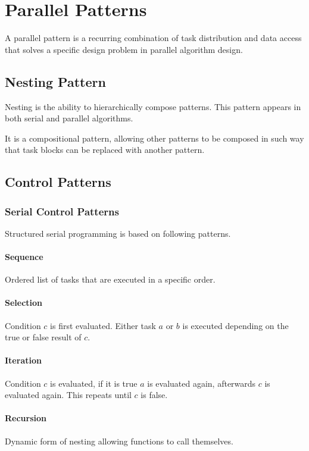 \section{Parallel Patterns}

A parallel pattern is a recurring combination of task distribution and data access that solves a specific design problem in parallel algorithm design.

\subsection{Nesting Pattern}

Nesting is the ability to hierarchically compose patterns.
This pattern appears in both serial and parallel algorithms.

It is a compositional pattern, allowing other patterns to be composed in such way that task blocks can be replaced with another pattern.

\subsection{Control Patterns}

\subsubsection{Serial Control Patterns}

Structured serial programming is based on following patterns.

\paragraph{Sequence}
Ordered list of tasks that are executed in a specific order.

\paragraph{Selection}
Condition $c$ is first evaluated.
Either task $a$ or $b$ is executed depending on the true or false result of $c$.

\paragraph{Iteration}
Condition $c$ is evaluated, if it is true $a$ is evaluated again,
afterwards $c$ is evaluated again.
This repeats until $c$ is false.

\paragraph{Recursion}
Dynamic form of nesting allowing functions to call themselves.

